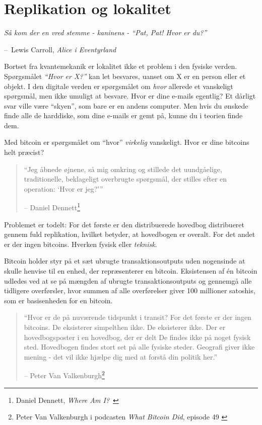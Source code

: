 \documentclass[paper=6in:9in,pagesize=pdftex,headinclude=on,footinclude=on,12pt]{scrbook}
\makeatletter
\newenvironment{chapquote}[2][4em]{\setlength{\@tempdima}{#1}%
   \def\chapquote@author{#2}%
   \parshape 1 \@tempdima \dimexpr\textwidth-2\@tempdima\relax%
   \itshape}{\par\normalfont\hfill--\ \chapquote@author\hspace*{\@tempdima}\par\bigskip}
\makeatother
\begin{document}
\chapter{Replikation og lokalitet}
\label{les:3}

\begin{chapquote}{Lewis Carroll, \textit{Alice i Eventyrland}} Så kom der en vred stemme - kaninens - \enquote{Pat, Pat! Hvor er du?} \end{chapquote}

Bortset fra kvantemekanik er lokalitet ikke et problem i den fysiske verden. Spørgsmålet \textit{\enquote{Hvor er X?}} kan let besvares, uanset om X er en person eller et objekt. I den digitale verden er spørgsmålet om \textit{hvor} allerede et vanskeligt spørgsmål, men ikke umuligt at besvare. Hvor er dine e-mails egentlig? Et dårligt svar ville være \enquote{skyen}, som bare er en andens computer. Men hvis du ønskede finde alle de harddiske, som dine e-mails er gemt på, kunne du i teorien finde dem.

Med bitcoin er spørgsmålet om \enquote{hvor} \textit{virkelig} vanskeligt. Hvor er dine bitcoins helt præcist?\begin{quotation}\begin{samepage} \enquote{Jeg åbnede øjnene, så mig omkring og stillede det uundgåelige, traditionelle, beklageligt overbrugte spørgsmål, der stilles efter en operation: `Hvor er jeg?'} \begin{flushright} -- Daniel Dennett\footnote{Daniel Dennett, \textit{Where Am I?}~\cite{where-am-i}}
\end{flushright}\end{samepage}\end{quotation}

Problemet er todelt: For det første er den distribuerede hovedbog distribueret gennem fuld replikation, hvilket betyder, at hovedbogen er overalt. For det andet er der ingen bitcoins. Hverken fysisk eller \textit{teknisk}.

Bitcoin holder styr på et sæt ubrugte transaktionsoutputs uden nogensinde at skulle henvise til en enhed, der repræsenterer en bitcoin. Eksistensen af \'en bitcoin udledes ved at se på mængden af ubrugte transaktionsoutputs og gennemgå alle tidligere overførsler, hvor summen af alle overførelser giver 100 millioner satoshis, som er basisenheden for en bitcoin.\begin{quotation}\begin{samepage} \enquote{Hvor er de på nuværende tidspunkt i transit? \href{...}{} For det første er der ingen bitcoins. De eksisterer simpelthen ikke. De eksisterer ikke. Der er hovedbogsposter i en hovedbog, der er delt \href{...}{} De findes ikke på noget fysisk sted. Hovedbogen findes stort set på alle fysiske steder. Geografi giver ikke mening - det vil ikke hjælpe dig med at forstå din politik her.} \begin{flushright} -- Peter Van Valkenburgh\footnote{Peter Van Valkenburgh i podcasten \textit{What Bitcoin Did}, episode 49 \cite{wbd049}}
\end{flushright}\end{samepage}\end{quotation}
\end{document}
